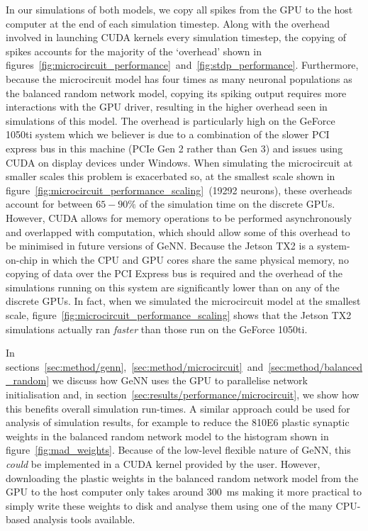 \documentclass[utf8]{frontiersSCNS} %
\begin{document}
In our simulations of both models, we copy all spikes from the GPU to the host computer at the end of each simulation timestep.
Along with the overhead involved in launching CUDA kernels every simulation timestep, the copying of spikes accounts for the majority of the `overhead' shown in figures~\ref{fig:microcircuit_performance}~and~\ref{fig:stdp_performance}.
Furthermore, because the microcircuit model has four times as many neuronal populations as the balanced random network model, copying its spiking output requires more interactions with the GPU driver, resulting in the higher overhead seen in simulations of this model.
The overhead is particularly high on the GeForce 1050ti system which we believer is due to a combination of the slower PCI express bus in this machine (PCIe Gen 2 rather than Gen 3) and issues using CUDA on display devices under Windows.
When simulating the microcircuit at smaller scales this problem is exacerbated so, at the smallest scale shown in figure~\ref{fig:microcircuit_performance_scaling}~(\num{19292} neurons), these overheads account for between $65-90\si{\percent}$ of the simulation time on the discrete GPUs.
However, CUDA allows for memory operations to be performed asynchronously and overlapped with computation, which should allow some of this overhead to be minimised in future versions of GeNN.
Because the Jetson TX2 is a system-on-chip in which the CPU and GPU cores share the same physical memory, no copying of data over the PCI Express bus is required and the overhead of the simulations running on this system are significantly lower than on any of the discrete GPUs.
In fact, when we simulated the microcircuit model at the smallest scale, figure~\ref{fig:microcircuit_performance_scaling} shows that the Jetson TX2 simulations actually ran \textit{faster} than those run on the GeForce 1050ti.

In sections~\ref{sec:method/genn},~\ref{sec:method/microcircuit}~and~\ref{sec:method/balanced_random} we discuss how GeNN uses the GPU to parallelise network initialisation and, in section~\ref{sec:results/performance/microcircuit}, we show how this benefits overall simulation run-times.
A similar approach could be used for analysis of simulation results, for example to reduce the \num{810E6} plastic synaptic weights in the balanced random network model to the histogram shown in figure~\ref{fig:mad_weights}.
Because of the low-level flexible nature of GeNN, this \textit{could} be implemented in a CUDA kernel provided by the user.
However, downloading the plastic weights in the balanced random network model from the GPU to the host computer only takes around \SI{300}{\milli\second} making it more practical to simply write these weights to disk and analyse them using one of the many CPU-based analysis tools available.
\end{document}
